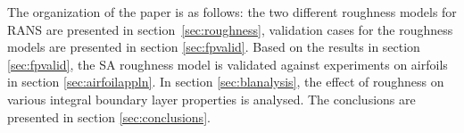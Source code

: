 The organization of the paper is as follows: the two different roughness models for RANS are presented in section~\ref{sec:roughness}, validation cases for the roughness models are presented in section \ref{sec:fpvalid}. Based on the results in section \ref{sec:fpvalid}, the SA roughness model is validated against experiments on airfoils in section \ref{sec:airfoilappln}. In section \ref{sec:blanalysis}, the effect of roughness on various integral boundary layer properties is analysed. The conclusions are presented in section \ref{sec:conclusions}. 

